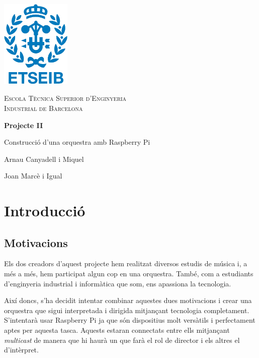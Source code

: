 \documentclass[a4paper]{paper}
\let\oldsection\section
\renewcommand\section{\clearpage\oldsection}
\begin{document}
\begin{titlepage}
	\centering
	\vspace{1cm}
	\includegraphics[width=0.25\textwidth]{images/etseib}
	\par\vspace{1cm}
	\textsc{ \LARGE Escola Tècnica Superior d'Enginyeria \\[1em] 
		Industrial de Barcelona}
	\par\vspace{2cm}
	\textbf{\LARGE Projecte II}
	\par\vspace{2cm}
	{\Huge Construcció d'una orquestra amb Raspberry Pi}
	\vfill
	\begin{flushright}
		\large
		Arnau Canyadell i Miquel \par
		Joan Marcè i Igual \par
	\end{flushright}
\end{titlepage}

\tableofcontents

\newpage

\section{Introducció}

\subsection{Motivacions}

Els dos creadors d'aquest projecte hem realitzat diversos estudis de música i, a més a més, hem participat algun cop en una orquestra. També, com a estudiants d'enginyeria industrial i informàtica que som, ens apassiona la tecnologia.

Així doncs, s'ha decidit intentar combinar aquestes dues motivacions i crear una orquestra que sigui interpretada i dirigida mitjançant tecnologia completament. S'intentarà usar Raspberry Pi ja que són dispositius molt versàtils i perfectament aptes per aquesta tasca. Aquests estaran connectats entre ells mitjançant \emph{multicast} de manera que hi haurà un que farà el rol de director i els altres el d'intèrpret.
\end{document}
